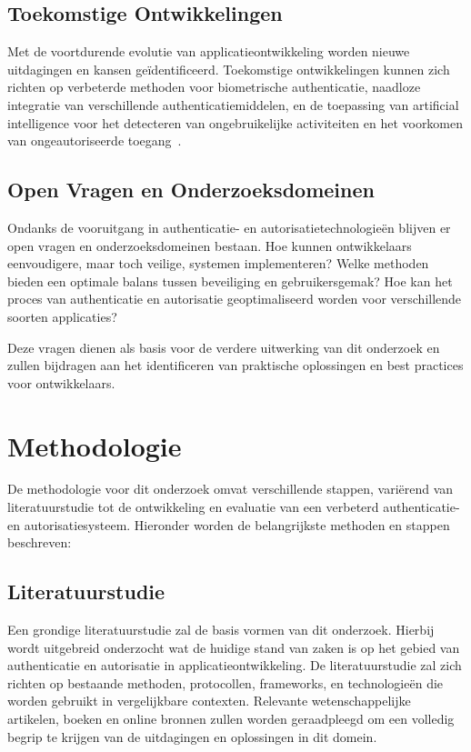 \subsection{Toekomstige Ontwikkelingen}

Met de voortdurende evolutie van applicatieontwikkeling worden nieuwe uitdagingen en kansen geïdentificeerd. Toekomstige ontwikkelingen kunnen zich
richten op verbeterde methoden voor biometrische authenticatie, naadloze integratie van verschillende authenticatiemiddelen, en de toepassing van
artificial intelligence voor het detecteren van ongebruikelijke activiteiten en het voorkomen van ongeautoriseerde toegang~\autocite{Annadurai2022}.

\subsection{Open Vragen en Onderzoeksdomeinen}

Ondanks de vooruitgang in authenticatie- en autorisatietechnologieën blijven er open vragen en onderzoeksdomeinen bestaan. Hoe kunnen ontwikkelaars
eenvoudigere, maar toch veilige, systemen implementeren? Welke methoden bieden een optimale balans tussen beveiliging en gebruikersgemak? Hoe kan
het proces van authenticatie en autorisatie geoptimaliseerd worden voor verschillende soorten applicaties?

Deze vragen dienen als basis voor de verdere uitwerking van dit onderzoek en zullen bijdragen aan het identificeren van praktische oplossingen en
best practices voor ontwikkelaars.

\section{Methodologie}%
\label{sec:methodologie}

De methodologie voor dit onderzoek omvat verschillende stappen, variërend van literatuurstudie tot de ontwikkeling en evaluatie van een verbeterd 
authenticatie- en autorisatiesysteem. Hieronder worden de belangrijkste methoden en stappen beschreven:

\subsection{Literatuurstudie}

Een grondige literatuurstudie zal de basis vormen van dit onderzoek. Hierbij wordt uitgebreid onderzocht wat de huidige stand van zaken is op het 
gebied van authenticatie en autorisatie in applicatieontwikkeling. De literatuurstudie zal zich richten op bestaande methoden, protocollen, frameworks, 
en technologieën die worden gebruikt in vergelijkbare contexten. Relevante wetenschappelijke artikelen, boeken en online bronnen zullen worden 
geraadpleegd om een volledig begrip te krijgen van de uitdagingen en oplossingen in dit domein.

